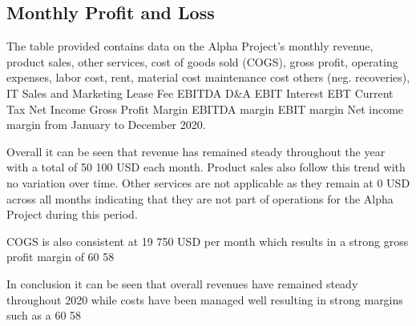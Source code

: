 

\subsection{Monthly Profit and Loss}\label{sec:title}

The table provided contains data on the Alpha Project's monthly revenue, product sales, other services, cost of goods sold (COGS), gross profit, operating expenses, labor cost, rent, material cost maintenance cost others (neg. recoveries), IT Sales and Marketing Lease Fee EBITDA D&A EBIT Interest EBT Current Tax Net Income Gross Profit Margin EBITDA margin EBIT margin Net income margin from January to December 2020. 

Overall it can be seen that revenue has remained steady throughout the year with a total of 50 100 USD each month. Product sales also follow this trend with no variation over time. Other services are not applicable as they remain at 0 USD across all months indicating that they are not part of operations for the Alpha Project during this period. 

COGS is also consistent at 19 750 USD per month which results in a strong gross profit margin of 60 58%

 In conclusion it can be seen that overall revenues have remained steady throughout 2020 while costs have been managed well resulting in strong margins such as a 60 58%